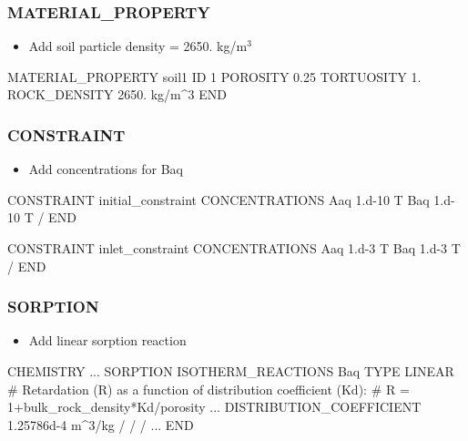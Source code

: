 \documentclass{beamer}
\newcommand\bluecomment[1]{{{\color{blue} #1}}}
\newcommand\magentacomment[1]{{{\color{magenta} #1}}}
\begin{document}
\begin{frame}\frametitle{MATERIAL\_PROPERTY}

\begin{itemize}
  \item Add soil particle density = 2650. kg/m$^3$
\end{itemize}

\begin{semiverbatim}

MATERIAL_PROPERTY soil1
  ID 1
  POROSITY 0.25
  TORTUOSITY 1.
  \magentacomment{ROCK_DENSITY 2650. kg/m^3}
END

\end{semiverbatim}

\end{frame}

\begin{frame}[fragile]\frametitle{CONSTRAINT}

\begin{itemize}
  \item Add concentrations for Baq
\end{itemize}

\begin{semiverbatim}

CONSTRAINT initial_constraint
  CONCENTRATIONS
    Aaq   1.d-10   T
    \magentacomment{Baq   1.d-10   T}
  /
END

CONSTRAINT inlet_constraint
  CONCENTRATIONS
    Aaq   1.d-3    T
    \magentacomment{Baq   1.d-3    T}
  /
END

\end{semiverbatim}

\end{frame}

\begin{frame}\frametitle{SORPTION}

\begin{itemize}
  \item Add linear sorption reaction
\end{itemize}

\begin{semiverbatim}
CHEMISTRY
  ...
  \magentacomment{SORPTION}
    \magentacomment{ISOTHERM_REACTIONS}
      \magentacomment{Baq}
        \magentacomment{TYPE LINEAR}
        \bluecomment{# Retardation (R) as a function of distribution coefficient (Kd):}
        \bluecomment{#   R = 1+bulk_rock_density*Kd/porosity}
        ...
        \magentacomment{DISTRIBUTION_COEFFICIENT 1.25786d-4 m^3/kg}
      \magentacomment{/}
    \magentacomment{/}
  \magentacomment{/}
  ...
END
\end{semiverbatim}

\end{frame}
\end{document}
